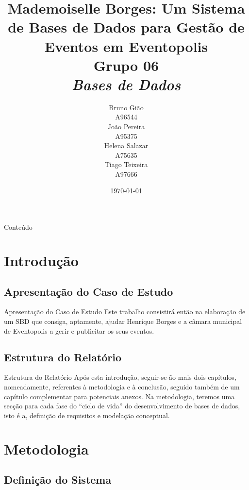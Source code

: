 \documentclass[compress,svgnames,handout,13.7pt]{beamer}
\title[Checkpoint]
    {\textbf{Mademoiselle Borges: Um Sistema de Bases de Dados para
Gestão de Eventos em Eventopolis\\
    \textbf{Grupo 06} \\
    \textit{Bases de Dados}}
}
\author[G06]{%
  \begin{tabular}{c}
    Bruno Gião \\
    A96544
  \end{tabular}
  \begin{tabular}{c}
    João Pereira \\
    A95375
  \end{tabular}
  \begin{tabular}{c}
    Helena Salazar \\
    A75635
  \end{tabular}
  \begin{tabular}{c}
    Tiago Teixeira \\
    A97666
  \end{tabular}
}
\date{\today}
\begin{document}
\thispagestyle{empty}
\frame{\titlepage}


\begin{frame}{Conteúdo}
\setcounter{secnumdepth}{2}
\setcounter{tocdepth}{2}
\tableofcontents
\end{frame}


\section{Introdução}

\subsection{Apresentação do Caso de Estudo}
\begin{frame}{Apresentação do Caso de Estudo}
Este trabalho consistirá então na elaboração de um SBD que consiga, aptamente, ajudar Henrique Borges
e a c\^amara municipal de Eventopolis a gerir e publicitar os seus eventos.
\end{frame}

\subsection{Estrutura do Relatório}
\begin{frame}{Estrutura do Relatório}
Após esta introdução, seguir-se-ão mais dois capítulos, nomeadamente, referentes à metodologia e à conclusão, seguido também de um capítulo complementar para potenciais anexos.
Na metodologia, teremos uma secção para cada fase do “ciclo de vida” do desenvolvimento
de bases de dados, isto é a, definição de requisitos e modelação conceptual.
\end{frame}

\section{Metodologia}

\subsection{Definição do Sistema}
\end{document}
